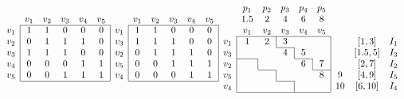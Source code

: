 \documentclass{article}
\theoremstyle{definition}
\numberwithin{equation}{section}
\begin{document}
\begin{figure}[t]

{\footnotesize
\[\begin{array}{c|ccccc|}
\multicolumn{1}{c}{} & v_1 & \multicolumn{1}{c}{v_2} & \multicolumn {1}{c}{v_3} & \multicolumn{1}{c}{v_4} &\multicolumn{1}{c}{v_{5}}  \\
\cline{2-6}
 v_1 & 1 & 1 & 0 & 0 & 0\\
v_2 & 0 & 1 & 1 & 1 & 0 \\
v_3 & 1 & 1 & 1 & 0 & 0\\
v_4 & 0 & 0 & 0 & 1 & 1\\
v_5 & 0 & 0 & 1 & 1 & 1 \\

\cline{2-6}
\end{array}
\begin{array}{c|ccccc|}
\multicolumn{1}{c}{} & v_1 & \multicolumn{1}{c}{v_2} & \multicolumn {1}{c}{v_3} & \multicolumn{1}{c}{v_4} &\multicolumn{1}{c}{v_{5}}  \\
\cline{2-6}
 v_1 & 1 & 1 & 0 & 0 & 0\\
v_3 & 1 & 1 & 1 & 0 & 0 \\
v_2 & 0 & 1 & 1 & 1 & 0\\
v_5 & 0 & 0 & 1 & 1 & 1\\
v_4 & 0 & 0 & 0 & 1 & 1 \\

\cline{2-6}
\end{array}
\begin{array}{c|c|c|c|c|c|ccc}
\multicolumn{1}{c}{} & \multicolumn{1}{c}{p_1} & \multicolumn{1}{c}{p_{2}} & \multicolumn{1}{c}{p_3} & \multicolumn{1}{c}{p_4} &\multicolumn{1}{c}{p_{5}}& \multicolumn{1}{c}{} && \\
\multicolumn{1}{c}{}&\multicolumn{1}{c}{1.5}&\multicolumn{1}{c}{2}&\multicolumn{1}{c}{4}&\multicolumn{1}{c}{6}&\multicolumn{1}{c}{8}&&&\\
\multicolumn{1}{c}{} & \multicolumn{1}{c}{v_1} & \multicolumn{1}{c}{v_{2}} & \multicolumn{1}{c}{v_3} & \multicolumn{1}{c}{v_4} &\multicolumn{1}{c}{v_{5}}& \multicolumn{1}{c}{}&&  \\
\cline{2-6}
v_1 & \multicolumn{1}{c}{1} &2 & \multicolumn{1}{c}{3}  & \multicolumn{1}{c}{} &&&[1,3]& I_{1} \\ 
\cline{4-4}
v_3 & \multicolumn{1}{c}{}  &\multicolumn{1}{c}{}  &  4&\multicolumn{1}{c}{5} &&&[1.5,5]& I_{3}  \\
\cline{5-5}
\cline{2-2} 
v_2 &   & \multicolumn{1}{c}{} & \multicolumn{1}{c}{}&6 & 7 &&[2,7]&I_{2}\\
\cline{6-6}
\cline{3-3}
v_5 & \multicolumn{1}{c}{} &  & \multicolumn{1}{c}{} & \multicolumn{1}{c}{}&8&9 & [4,9] & I_{5} \\
\cline{4-4}
v_4  & \multicolumn{1}{c}{} &  \multicolumn{1}{c}{} & & \multicolumn{1}{c}{}&&10& [6,10] & I_{4} \\
\cline{2-6}


\end{array}\]}
\end{figure}
\end{document}
